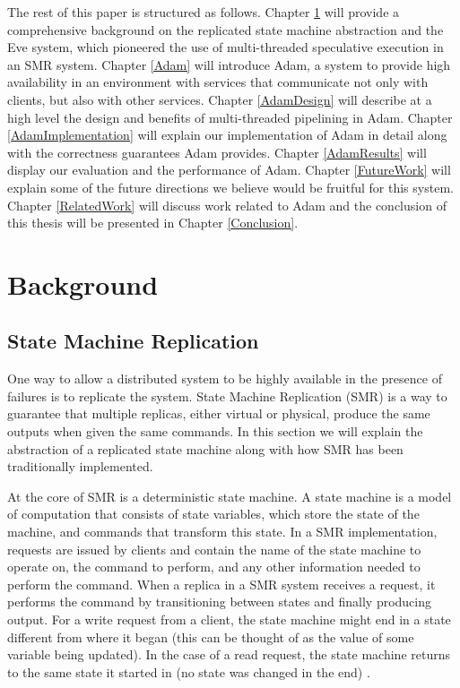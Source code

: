 \documentclass[11pt, oneside]{report}
\begin{document}
The rest of this paper is structured as follows. 
Chapter \ref{Background} will provide a comprehensive background on the replicated state machine abstraction and the Eve system, which pioneered the use of multi-threaded speculative execution in an SMR system. 
Chapter \ref{Adam} will introduce Adam, a system to provide high availability in an environment with services that communicate not only with clients, but also with other services. 
Chapter \ref{AdamDesign} will describe at a high level the design and benefits of multi-threaded pipelining in Adam. 
Chapter \ref{AdamImplementation} will explain our implementation of Adam in detail along with the correctness guarantees Adam provides. 
Chapter \ref{AdamResults} will display our evaluation and the performance of Adam. 
Chapter \ref{FutureWork} will explain some of the future directions we believe would be fruitful for this system.
Chapter \ref{RelatedWork} will discuss work related to Adam and the conclusion of this thesis will be presented in Chapter \ref{Conclusion}.

\chapter{Background}\label{Background}
\section{State Machine Replication}
One way to allow a distributed system to be highly available in the presence of failures is to replicate the system.
State Machine Replication (SMR) is a way to guarantee that multiple replicas, either virtual or physical, produce the same outputs when given the same commands. 
In this section we will explain the abstraction of a replicated state machine along with how SMR has been traditionally implemented.

At the core of SMR is a deterministic state machine. 
A state machine is a model of computation that consists of state variables, which store the state of the machine, and commands that transform this state. 
In a SMR implementation, requests are issued by clients and contain the name of the state machine to operate on, the command to perform, and any other information needed to perform the command. 
When a replica in a SMR system receives a request, it performs the command by transitioning between states and finally producing output. 
For a write request from a client, the state machine might end in a state different from where it began (this can be thought of as the value of some variable being updated). 
In the case of a read request, the state machine returns to the same state it started in (no state was changed in the end) \cite{schneider}.
\end{document}
